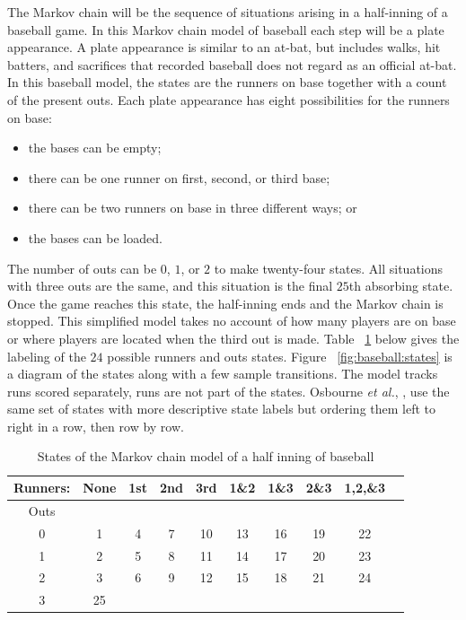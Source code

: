 \documentclass[12pt]{article}
\begin{document}
The Markov chain will be the sequence of situations arising in a
half-inning of a baseball game.  In this Markov chain model of baseball
each step will be a plate appearance.  A plate appearance is similar to
an at-bat, but includes walks, hit batters, and sacrifices that recorded
baseball does not regard as an official at-bat.  In this baseball model,
the states are the runners on base together with a count of the present
outs.  Each plate appearance has eight possibilities for the runners on
base:
\begin{itemize}
    \item
        the bases can be empty;
    \item
        there can be one runner on first, second, or third base;
    \item
        there can be two runners on base in three different ways; or
    \item
        the bases can be loaded.
\end{itemize}
The number of outs can be \( 0 \), \( 1 \), or \( 2 \) to make
twenty-four states.  All situations with three outs are the same, and
this situation is the final \( 25 \)th absorbing state.  Once the game
reaches this state, the half-inning ends and the Markov chain is
stopped.  This simplified model takes no account of how many players are
on base or where players are located when the third out is made.  Table~%
\ref{tab:baseball:states} below gives the labeling of the \( 24 \)
possible runners and outs states.  Figure~%
\ref{fig:baseball:states} is a diagram of the states along with a few
sample transitions.  The model tracks runs scored separately, runs are
not part of the states.  Osbourne \emph{et al.}, \cite{osbourne20},
use the same set of states with more descriptive state labels but
ordering them left to right in a row, then row by row. 
\begin{table}
    \centering
    \begin{tabular}{cccccccccc}
        \toprule Runners: & None & 1st & 2nd & 3rd & 1\&2 & 1\&3 & 2\&3 & 1,2,\&3 \\ 
        \midrule Outs     &      &     &     &     &      &      &      &         \\ 
        0                 & 1    & 4   & 7   & 10  & 13   & 16   & 19   & 22      \\ 
        1                 & 2    & 5   & 8   & 11  & 14   & 17   & 20   & 23      \\ 
        2                 & 3    & 6   & 9   & 12  & 15   & 18   & 21   & 24      \\ 
        3                 & 25   &     &     &     &      &      &      &         \\ 
        \bottomrule
    \end{tabular}
    \caption{States of the Markov chain model of a half inning of
    baseball}%
    \label{tab:baseball:states}
\end{table}
\end{document}
